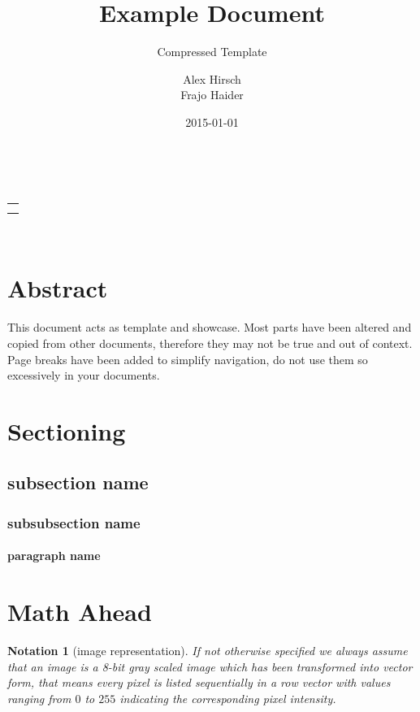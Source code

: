 \documentclass[10pt,a4paper,parskip=half]{scrartcl}
\title{Example Document}
\subtitle{Compressed Template}
\author{Alex Hirsch \\ Frajo Haider}
\date{2015-01-01}
\makeatletter
\theoremstyle{plain}
\newtheorem{notation}[theorem]{Notation}
\def\maketitle{%
    \begin{minipage}[t]{0.8\linewidth}%
        \flushleft%
        \LARGE\sffamily\@title\\
        \large\sffamily\@subtitle
    \end{minipage}%
    \hfill%
    \begin{minipage}[t]{0.2\linewidth}%
        \flushright\sffamily%
        \begin{tabular}[t]{r}\@author\\\@date\end{tabular}\\
    \end{minipage}%
}
\makeatother
\begin{document}
\maketitle

\section*{Abstract}
\label{sec:abstract}

This document acts as template and showcase. Most parts have been altered and
copied from other documents, therefore they may not be true and out of context.
Page breaks have been added to simplify navigation, do not use them so
excessively in your documents.

\section{Sectioning}
\label{sec:sectioning}

\lipsum[1]

\subsection{subsection name}
\label{sub:subsection_name}

\lipsum[2]

\lipsum[2]

\subsubsection{subsubsection name}
\label{ssub:subsubsection_name}

\lipsum[2]

\paragraph{paragraph name}
\label{par:paragraph_name}

\lipsum[2]

\newpage

\section{Math Ahead}
\label{sec:math_ahead}

\begin{notation}[image representation]
    If not otherwise specified we always assume that an image is a 8-bit gray
    scaled image which has been transformed into vector form, that means every
    pixel is listed sequentially in a row vector with values ranging from $0$
    to $255$ indicating the corresponding pixel intensity.
\end{notation}
\end{document}
